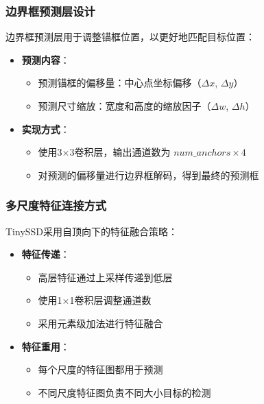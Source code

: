 \documentclass[UTF8]{ctexart}
\begin{document}
\subsubsection{边界框预测层设计}
边界框预测层用于调整锚框位置，以更好地匹配目标位置：
\begin{itemize}
    \item \textbf{预测内容}：
    \begin{itemize}
        \item 预测锚框的偏移量：中心点坐标偏移（$\Delta x$, $\Delta y$）
        \item 预测尺寸缩放：宽度和高度的缩放因子（$\Delta w$, $\Delta h$）
    \end{itemize}
    \item \textbf{实现方式}：
    \begin{itemize}
        \item 使用3$\times$3卷积层，输出通道数为 $num\_anchors \times 4$
        \item 对预测的偏移量进行边界框解码，得到最终的预测框
    \end{itemize}
\end{itemize}

\subsubsection{多尺度特征连接方式}
TinySSD采用自顶向下的特征融合策略：
\begin{itemize}
    \item \textbf{特征传递}：
    \begin{itemize}
        \item 高层特征通过上采样传递到低层
        \item 使用1$\times$1卷积层调整通道数
        \item 采用元素级加法进行特征融合
    \end{itemize}
    \item \textbf{特征重用}：
    \begin{itemize}
        \item 每个尺度的特征图都用于预测
        \item 不同尺度特征图负责不同大小目标的检测
    \end{itemize}
\end{itemize}
\end{document}
